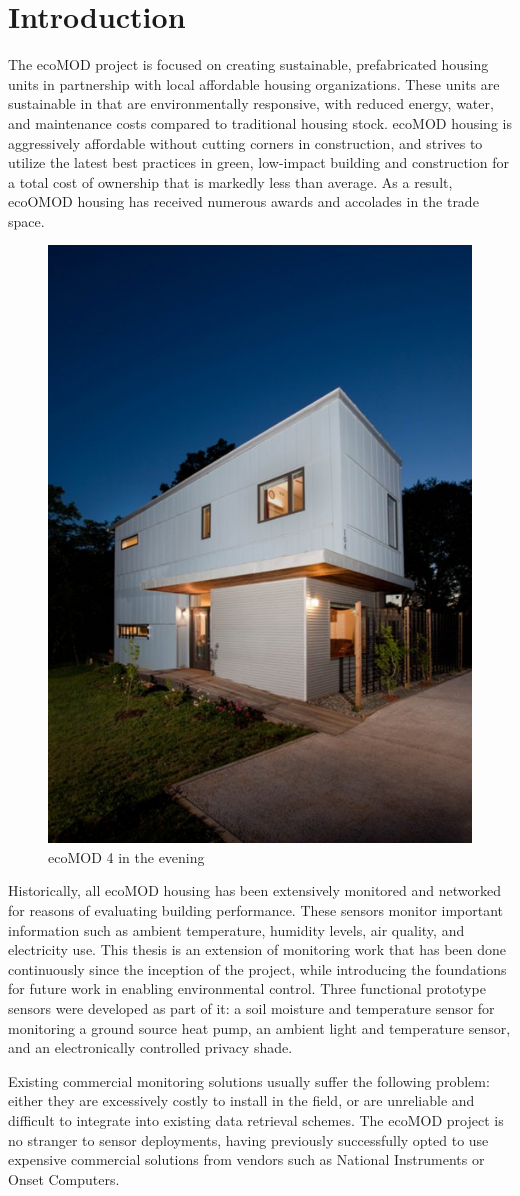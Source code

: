 \chapter{Introduction}

The ecoMOD project is focused on creating sustainable, prefabricated housing units in partnership with local affordable housing organizations. These units are sustainable in that are environmentally responsive, with reduced energy, water, and maintenance costs compared to traditional housing stock. ecoMOD housing is aggressively affordable without cutting corners in construction, and strives to utilize the latest best practices in green, low-impact building and construction for a total cost of ownership that is markedly less than average. As a result, ecoOMOD housing has received numerous awards and accolades in the trade space\cite{Lau2013}.

\begin{figure}
\centering
\includegraphics[width=0.3\linewidth]{./images/SFSmith_110602_8113-copy-500x705}
\caption{ecoMOD 4 in the evening\cite{Smith2011}}
\label{fig:SFSmith_110602_8113-copy-500x705}
\end{figure}

Historically, all ecoMOD housing has been extensively monitored and networked for reasons of evaluating building performance. These sensors monitor important information such as ambient temperature, humidity levels, air quality, and electricity use. This thesis is an extension of monitoring work that has been done continuously since the inception of the project, while introducing the foundations for future work in enabling environmental control. Three functional prototype sensors were developed as part of it: a soil moisture and temperature sensor for monitoring a ground source heat pump, an ambient light and temperature sensor, and an electronically controlled privacy shade.

Existing commercial monitoring solutions usually suffer the following problem: either they are excessively costly to install in the field, or are unreliable and difficult to integrate into existing data retrieval schemes. The ecoMOD project is no stranger to sensor deployments, having previously successfully opted to use expensive commercial solutions from vendors such as National Instruments or Onset Computers.

